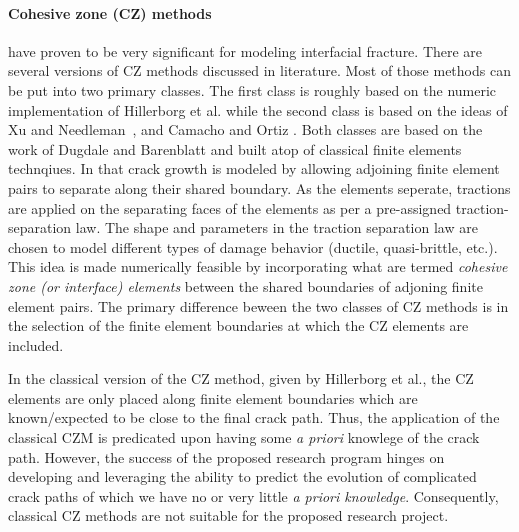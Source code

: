 \documentclass[12pt,onecolumn]{article}
\begin{document}
\paragraph{Cohesive zone (CZ) methods} have proven to be very significant for modeling interfacial fracture. There are several versions of CZ methods discussed in literature. Most of those methods can be put into two primary classes. The first class is roughly based on the numeric implementation of Hillerborg et al.\cite{hillerborg1976analysis}  while the second class is based on the ideas of Xu and Needleman~\cite{xu1994numerical}, and Camacho and Ortiz \cite{camacho1996computational}. Both classes are based on the work of Dugdale \cite{dugdale1960yielding} and Barenblatt \cite{barenblatt1962mathematical} and built atop of classical finite elements technqiues. In that crack growth is modeled by allowing adjoining finite  element pairs to separate along their shared boundary. As the elements seperate, tractions are applied on the separating faces of the elements as per a pre-assigned traction-separation law. The shape and parameters in the traction separation law are chosen to model different types of damage behavior (ductile, quasi-brittle, etc.). This idea is made numerically feasible by incorporating what are termed \textit{cohesive zone (or interface) elements} between the shared boundaries of adjoning finite element pairs. The primary difference beween the two classes of CZ methods is in the selection of the finite element boundaries at which the CZ elements are included.


In the classical version of the CZ method, given by Hillerborg et al., the CZ elements are only placed along finite element boundaries which are known\slash expected to be close to the final crack path. Thus, the application of the classical CZM is  predicated upon having some \textit{a priori} knowlege of the crack path. However, the success of the proposed research program hinges on developing and leveraging the ability to predict the evolution of complicated crack paths of which we have no or very little \textit{a priori knowledge}. Consequently, classical CZ methods are not suitable for the proposed research project.%
\end{document}
